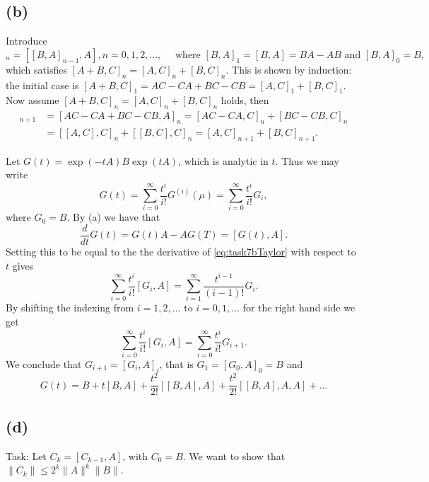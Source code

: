 \subsection*{(b)}
Introduce
\begin{equation}
[B,A]_{n} =  [[B,A]_{n-1},A], n = 0,1,2,\ldots, \quad \text{ where }[B,A]_{1} = [B,A] = BA-AB \text{ and } [B,A]_{0} = B,
\end{equation}
which satisfies $[A+B,C]_{n} = [A,C]_{n} + [B,C]_{n}$. This is shown by induction: the initial case is $[A+B,C]_{1} = AC-CA + BC-CB = [A,C]_{1}+[B,C]_{1}$. Now assume $[A+B,C]_{n} = [A,C]_{n} + [B,C]_{n}$ holds, then
\begin{align}
[A+B,C]_{n+1} &=  [AC-CA + BC-CB,A]_{n} = [AC-CA,C]_{n} + [BC-CB,C]_{n} \\
&= [[A,C],C]_{n} + [[B,C],C]_{n}=[A,C]_{n+1} + [B,C]_{n+1}.
\end{align}


Let $G(t) = \exp(-tA)B\exp(tA)$, which is analytic in $t$. Thus we may write
\begin{equation}
  \label{eq:task7bTaylor}
G(t) = \sum\limits_{i = 0}^{\infty}\frac{t^{i}}{i!} G^{(i)}(\mu)=\sum\limits_{i = 0}^{\infty}\frac{t^{i}}{i!} G_{i},
\end{equation}
where $G_{0} = B$.
By (a) we have that
\begin{equation}
  \frac{d}{dt}G(t) = G(t)A-AG(T) = [G(t),A].
\end{equation}
Setting this to be equal to the the derivative of \eqref{eq:task7bTaylor} with respect to $t$ gives
\begin{equation}
\sum\limits_{i = 0}^{\infty}\frac{t^{i}}{i!} [G_{i},A] = \sum\limits_{i = 1}^{\infty}\frac{t^{i-1}}{(i-1)!} G_{i}.
\end{equation}
By shifting the indexing from $i = 1,2,\ldots $ to $i = 0,1,\ldots$ for the right hand side we get
\begin{equation}
\sum\limits_{i = 0}^{\infty}\frac{t^{i}}{i!} [G_{i},A] = \sum\limits_{i = 0}^{\infty}\frac{t^{i}}{i!} G_{i+1}.
\end{equation}
We conclude that $G_{i+1} = [G_{i},A]_{i}$, that is $G_{1} = [G_{0},A]_{0} = B$ and
\begin{equation}
  G(t) = B + t[B,A]+\frac{t^{2}}{2!}[[B,A],A]+\frac{t^{2}}{2!}[[B,A],A,A]+\ldots
\end{equation}


\subsection*{(d)}
Task: Let $C_k = [C_{k-1},A]$, with $C_0 = B$. We want to show that $\|C_k\|\leq 2^k\|A\|^k\|B\|$.

